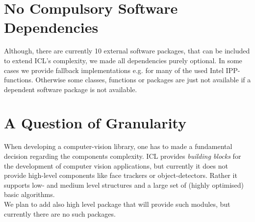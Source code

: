  
\section{No Compulsory Software Dependencies}
Although, there are currently 10 external software packages, that can be included to extend ICL's complexity, we made all dependencies purely optional. In some cases we provide fallback implementations e.g. for many of the used Intel IPP-functions. Otherwise some classes, functions or packages are just not available if a dependent software package is not available.

\section{A Question of Granularity}
When developing a computer-vision library, one has to made a fundamental decision regarding the components complexity. ICL provides \emph{building blocks} for the development of computer vision applications, but currently it does not provide high-level components like face trackers or object-detectors. Rather it supports low- and medium level structures and a large set of (highly optimised) basic algorithms.\\
We plan to add also high level package that will provide such modules, but currently there are no such packages.


